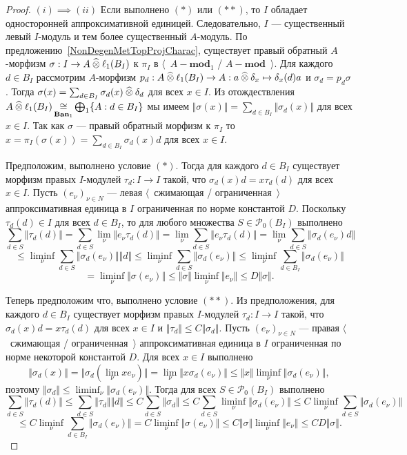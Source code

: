 \begin{proof} $(i) \implies (ii)$ Если выполнено $(*)$ или $(**)$, то $I$
обладает односторонней аппроксимативной единицей. Следовательно, $I$ ---
существенный левый $I$-модуль и тем более существенный $A$-модуль. По
предложению~\ref{NonDegenMetTopProjCharac}, существует правый обратный
$A$-морфизм $\sigma:I\to A\mathbin{\widehat{\otimes}} \ell_1(B_I)$ к $\pi_I$ в
$\langle$~$A-\mathbf{mod}_1$ / $A-\mathbf{mod}$~$\rangle$. Для каждого $d\in
B_I$ рассмотрим $A$-морфизм $p_d:A\mathbin{\widehat{\otimes}} \ell_1(B_I)\to A:a\mathbin{\widehat{\otimes}}
\delta_x\mapsto \delta_x(d)a$ и $\sigma_d=p_d\sigma$. Тогда
$\sigma(x)=\sum_{d\in B_I}\sigma_d(x)\mathbin{\widehat{\otimes}} \delta_d$ для всех $x\in I$. Из
отождествления $A\mathbin{\widehat{\otimes}}\ell_1(B_I)\mathop{\mathbin{\cong}}\limits_{\mathbf{Ban}_1}\bigoplus_1 \{A:d\in
B_I \}$ мы имеем $\Vert\sigma(x)\Vert=\sum_{d\in B_I} \Vert\sigma_d(x)\Vert$ для
всех $x\in I$. Так как $\sigma$ --- правый обратный морфизм к $\pi_I$ то
$x=\pi_I(\sigma(x))=\sum_{d\in B_I}\sigma_d(x)d$ для всех $x\in I$. 

Предположим, выполнено условие $(*)$. Тогда для каждого $d\in B_I$ существует
морфизм правых $I$-модулей $\tau_d:I\to I$ такой, что $\sigma_d(x)d=x\tau_d(d)$
для всех $x\in I$.  Пусть ${(e_\nu)}_{\nu\in N}$ --- левая $\langle$~сжимающая /
ограниченная~$\rangle$ аппроксимативная единица в $I$ ограниченная по норме
константой $D$. Поскольку $\tau_d(d)\in I$ для всех $d\in B_I$, то для любого
множества $S\in\mathcal{P}_0(B_I)$ выполнено
$$
\sum_{d\in S}\Vert \tau_d(d)\Vert
=\sum_{d\in S}\lim_{\nu}\Vert e_\nu \tau_d(d) \Vert
=\lim_{\nu}\sum_{d\in S}\Vert e_\nu \tau_d(d)\Vert
=\lim_{\nu}\sum_{d\in S}\Vert \sigma_d(e_\nu)d \Vert
$$
$$
\leq\liminf_{\nu}\sum_{d\in S}\Vert\sigma_d(e_\nu)\Vert\Vert d\Vert 
\leq\liminf_{\nu}\sum_{d\in S}\Vert\sigma_d(e_\nu)\Vert
\leq\liminf_{\nu}\sum_{d\in B_I}\Vert\sigma_d(e_\nu)\Vert
$$
$$
=\liminf_{\nu}\Vert\sigma(e_\nu)\Vert
\leq\Vert\sigma\Vert\liminf_{\nu}\Vert e_\nu\Vert
\leq D\Vert\sigma\Vert.
$$

Теперь предположим что, выполнено условие $(**)$. Из предположения, для каждого
$d\in B_I$ существует морфизм правых $I$-модулей $\tau_d:I\to I$ такой, что
$\sigma_d(x)d=x\tau_d(d)$ для всех $x\in I$ и $\Vert\tau_d\Vert\leq
C\Vert\sigma_d\Vert$. Пусть ${(e_\nu)}_{\nu\in N}$ --- правая $\langle$~сжимающая
/ ограниченная~$\rangle$ аппроксимативная единица в $I$ ограниченная по норме
некоторой константой $D$. Для всех $x\in I$ выполнено
$$
\Vert\sigma_d(x)\Vert
=\Vert\sigma_d(\lim_\nu x e_\nu)\Vert
=\lim_\nu\Vert x\sigma_d(e_\nu)\Vert
\leq\Vert x\Vert\liminf_\nu\Vert\sigma_d(e_\nu)\Vert,
$$
поэтому $\Vert\sigma_d\Vert\leq \liminf_\nu\Vert\sigma_d(e_\nu)\Vert$. Тогда для
всех $S\in\mathcal{P}_0(B_I)$ выполнено
$$
\sum_{d\in S}\Vert \tau_d(d)\Vert
\leq \sum_{d\in S}\Vert \tau_d\Vert\Vert d\Vert
\leq C\sum_{d\in S}\Vert \sigma_d\Vert
\leq C\sum_{d\in S}\liminf_\nu \Vert \sigma_d(e_\nu)\Vert
\leq C\liminf_{\nu}\sum_{d\in S}\Vert \sigma_d(e_\nu) \Vert
$$
$$
\leq C\liminf_{\nu}\sum_{d\in B_I}\Vert \sigma_d(e_\nu) \Vert
=C\liminf_{\nu}\Vert\sigma(e_\nu)\Vert
\leq C\Vert\sigma\Vert\liminf_{\nu}\Vert e_\nu\Vert
\leq CD\Vert\sigma\Vert.
$$


\end{proof}
